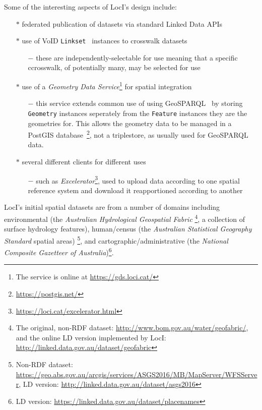 \documentclass[runningheads]{llncs}
\begin{document}
Some of the interesting aspects of LocI's design include:

\begin{itemize}
    \item[$\ast$] federated publication of datasets via standard Linked Data APIs
    \item[$\ast$] use of VoID \texttt{Linkset}~\cite{alexander_describing_2011} instances to crosswalk datasets
    \begin{itemize}
        \item[$-$] these are independently-selectable for use meaning that a specific ccrosswalk, of potentially many, may be selected for use
    \end{itemize} 
    \item[$\ast$] use of a \textit{Geometry Data Service}\footnote{The service is online at \url{https://gds.loci.cat/}} for spatial integration
    \begin{itemize}
        \item[$-$] this service extends common use of using GeoSPARQL~\cite{open2012ogc} by storing \texttt{Geometry} instances seperately from the \texttt{Feature} instances they are the geometries for. This allows the geometry data to be managed in a PostGIS database~\footnote{\url{https://postgis.net/}}, not a triplestore, as usually used for GeoSPARQL data.
    \end{itemize}
    \item[$\ast$] several different clients for different uses
    \begin{itemize}
        \item[$-$] such as \textit{Excelerator}\footnote{\url{https://loci.cat/excelerator.html}}, used to upload data according to one spatial reference system and download it reapportioned according to another
    \end{itemize}
\end{itemize} 

LocI's initial spatial datasets are from a number of domains including environmental (the \textit{Australian Hydrological Geospatial Fabric}
\footnote{The original, non-RDF dataset: \url{http://www.bom.gov.au/water/geofabric/}, and the online LD version implemented by LocI: \url{http://linked.data.gov.au/dataset/geofabric}}, 
a collection of surface hydrology features), human/census (the \textit{Australian Statistical Geography Standard} spatial areas)
\footnote{Non-RDF dataset: \url{https://geo.abs.gov.au/arcgis/services/ASGS2016/MB/MapServer/WFSServer}, LD version: \url{http://linked.data.gov.au/dataset/asgs2016}}, 
and cartographic/administrative (the \textit{National Composite Gazetteer of Australia})\footnote{LD version: \url{https://linked.data.gov.au/dataset/placenames}}. 
\end{document}
